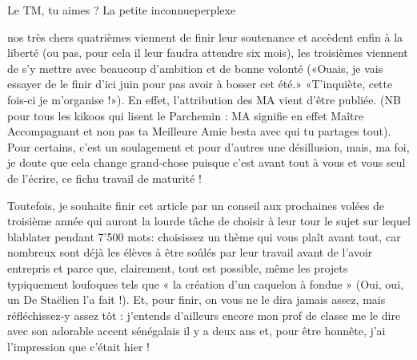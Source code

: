 \ligne


\vspace*{-5mm}
\begin{article}
{Le TM, tu aimes ?}
{La petite inconnue}{perplexe}

 nos très chers quatrièmes viennent de finir leur soutenance et accèdent enfin à la liberté (ou pas, pour cela il leur faudra attendre six mois), les troisièmes viennent de s’y mettre avec beaucoup d’ambition et de bonne volonté («Ouais, je vais essayer de le finir d’ici juin pour pas avoir à bosser cet été.» «T’inquiète, cette fois-ci je m’organise !»). En effet, l’attribution des MA vient d’être publiée. (NB pour tous les kikoos qui lisent le Parchemin : MA signifie en effet Maître Accompagnant et non pas ta Meilleure Amie besta avec qui tu partages tout). Pour certains, c’est un soulagement et pour d’autres une désillusion, mais, ma foi, je doute que cela change grand-chose puisque c’est avant tout à vous et vous seul de l’écrire, ce fichu travail de maturité ! 

Toutefois, je souhaite finir cet article par un conseil aux prochaines volées de troisième année qui auront la lourde tâche de choisir à leur tour le sujet sur lequel blablater pendant 7'500 mots: choisissez un thème qui vous plaît avant tout, car nombreux sont déjà les élèves à être soûlés par leur travail avant de l’avoir entrepris et parce que, clairement, tout est possible, même les projets typiquement loufoques tels que « la création d’un caquelon à fondue » (Oui, oui, un De Staëlien l’a fait !). Et, pour finir, on vous ne le dira jamais assez, mais réfléchissez-y assez tôt : j’entends d’ailleurs encore mon prof de classe me le dire avec son adorable accent sénégalais il y a deux ans et, pour être honnête, j’ai l’impression que c’était hier !
\end{article}

\vspace*{-.6cm}


\newlength{\retourLigne}
\setlength{\retourLigne}{3mm}



